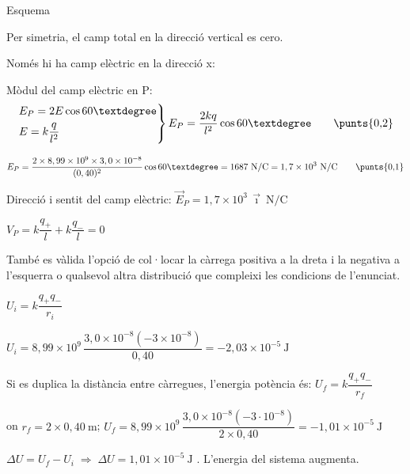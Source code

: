 \begin{solapartat}

 Esquema

 Per simetria, el camp total en la direcció vertical es cero.

Només hi ha camp elèctric en la direcció x:

Mòdul del camp elèctric en P:
\[ \left.\begin{aligned} &E_P = 2E\cos 60°\\ &E = k\frac{q}{l^2}\end{aligned}\right\}
E_P = \frac{2kq}{l^2}\cos 60° \qquad \text{\punts{0,2}} \]

\[ E_P = \frac{2\times 8,99\times 10^{9}\times 3,0\times 10^{-8}}{(0,40)^2}\cos 60° = 1687\ \mathrm{N/C} = 1,7\times 10^{3}\ \mathrm{N/C} \qquad \text{\punts{0,1}} \]

Direcció i sentit del camp elèctric: $\vec{E}_P = 1,7\times 10^{3}\,\vec{\imath}\ \mathrm{N/C}$ 

 $V_P = k\dfrac{q_+}{l} + k\dfrac{q_-}{l} = 0$

També es vàlida l'opció de col·locar la càrrega positiva a la dreta i la negativa a l'esquerra o qualsevol altra distribució que compleixi les condicions de l'enunciat.
\end{solapartat}

\begin{solapartat}
 $U_i = k\dfrac{q_+q_-}{r_i}$

 $U_i = 8,99\times 10^{9}\,\dfrac{3,0\times 10^{-8}(-3\times 10^{-8})}{0,40} = -2,03\times 10^{-5}\ \mathrm{J}$

Si es duplica la distància entre càrregues, l'energia potència és: $U_f = k\dfrac{q_+q_-}{r_f}$

on $r_f = 2\times 0,40\ \mathrm{m}$; $U_f = 8,99\times 10^{9}\,\dfrac{3,0\times 10^{-8}(-3\cdot 10^{-8})}{2\times 0,40} = -1,01\times 10^{-5}\ \mathrm{J}$ 

$\Delta U = U_f - U_i \;\Rightarrow\; \Delta U = 1,01\times 10^{-5}\ \mathrm{J}$ . L'energia del sistema augmenta.
\end{solapartat}
